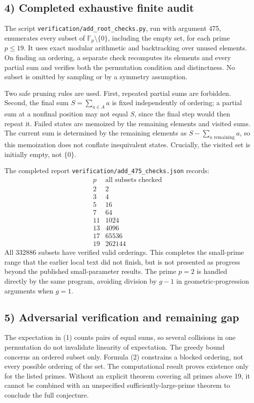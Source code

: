 \subsection*{4) Completed exhaustive finite audit}
The script \texttt{verification/add\_root\_checks.py}, run with argument 475, enumerates every subset of $\mathbb F_p\setminus\{0\}$, including the empty set, for each prime $p\leq19$. It uses exact modular arithmetic and backtracking over unused elements. On finding an ordering, a separate check recomputes its elements and every partial sum and verifies both the permutation condition and distinctness. No subset is omitted by sampling or by a symmetry assumption.

Two safe pruning rules are used. First, repeated partial sums are forbidden. Second, the final sum $S=\sum_{a\in A}a$ is fixed independently of ordering; a partial sum at a nonfinal position may not equal $S$, since the final step would then repeat it. Failed states are memoized by the remaining elements and visited sums. The current sum is determined by the remaining elements as $S-\sum_{a\text{ remaining}}a$, so this memoization does not conflate inequivalent states. Crucially, the visited set is initially empty, not $\{0\}$.

The completed report \texttt{verification/add\_475\_checks.json} records:
\[
\begin{array}{c|r}
p&\text{all subsets checked}\\
2&2\\3&4\\5&16\\7&64\\11&1024\\13&4096\\17&65536\\19&262144
\end{array}
\]
All 332886 subsets have verified valid orderings. This completes the small-prime range that the earlier local text did not finish, but is not presented as progress beyond the published small-parameter results. The prime $p=2$ is handled directly by the same program, avoiding division by $g-1$ in geometric-progression arguments when $g=1$.

\subsection*{5) Adversarial verification and remaining gap}
The expectation in (1) counts pairs of equal sums, so several collisions in one permutation do not invalidate linearity of expectation. The greedy bound concerns an ordered subset only. Formula (2) constrains a blocked ordering, not every possible ordering of the set. The computational result proves existence only for the listed primes. Without an explicit theorem covering all primes above 19, it cannot be combined with an unspecified sufficiently-large-prime theorem to conclude the full conjecture.

